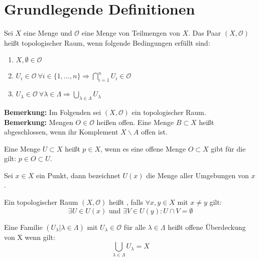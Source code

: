\chapter{Grundlegende Definitionen}

\begin{Def}
	Sei \(X\) eine Menge und \( \mathcal{O} \) eine Menge von Teilmengen von \(X\). Das Paar \((X,\mathcal{O})\) heißt topologischer Raum, wenn folgende Bedingungen erfüllt sind:
	\begin{enumerate}
		\item \( X, \emptyset \in \mathcal{O} \) 
		\item \( U_{i} \in \mathcal{O} \ \forall  i \in \{1, \dots, n\} 
			\Rightarrow \bigcap_{i=1}^n U_{i} \in  \mathcal{O} \)
		\item \( U_{\lambda} \in \mathcal{O} \ \forall \lambda \in \Lambda \Rightarrow \bigcup_{\lambda \in \Lambda} U_{\lambda} \)
	\end{enumerate}
\end{Def}
{\bf Bemerkung:} Im Folgenden sei \((X,\mathcal{O})\) ein topologischer Raum.
\\
{\bf Bemerkung:} Mengen \(O \in \mathcal{O} \) heißen offen. Eine Menge \(B \subset X\) heißt abgeschlossen, wenn ihr Komplement \( X \backslash A\) offen ist.

\begin{Def} 
	Eine Menge \(U \subset X\) heißt  \(p \in X\), wenn es eine offene Menge \(O \subset X\) gibt für die gilt: 
	\(p \in O \subset U\).
\end{Def}

\begin{Def}
	Sei \(x \in X\) ein Punkt, dann bezeichnet \(U(x)\) die Menge aller Umgebungen von \(x\). 
\end{Def}

\begin{Def}[hausdorffsch]
	Ein topologischer Raum \((X,\mathcal{O})\) heißt , falls \( \forall x,y \in X\) mit \(x\ne y\) gilt:
	\[\exists U \in U(x) \mbox{ und } \exists V \in U(y) : U \cap V = \emptyset \]
\end{Def}

\begin{Def}
	Eine Familie \( (U_{\lambda} | \lambda \in \Lambda) \) mit \(U_{\lambda} \in \mathcal{O} \) für alle \( \lambda \in \Lambda \) heißt 	offene Überdeckung von X wenn gilt:
	\[ \bigcup_{\lambda \in \Lambda } U_{\lambda} = X \]
\end{Def}

	



